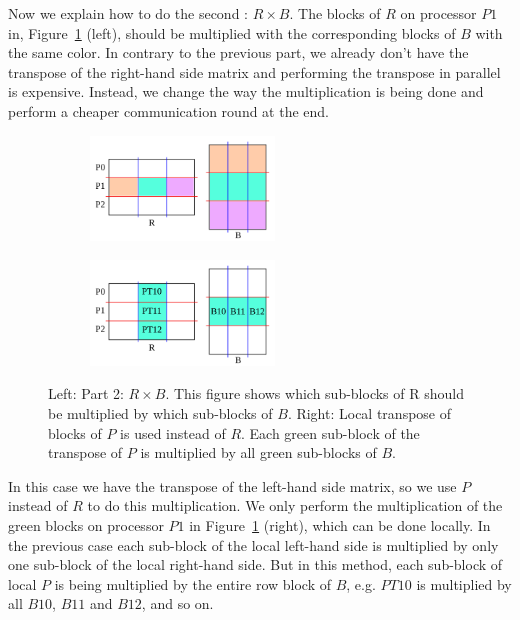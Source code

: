 Now we explain how to do the second \mm: $R \times B$. The blocks of $R$ on processor $P1$ in, Figure~\ref{fig:part2d} (left), should be multiplied with the corresponding blocks of $B$ with the same color. In contrary to the previous part, we already don't have the transpose of the right-hand side matrix and performing the transpose in parallel is expensive. Instead, we change the way the multiplication is being done and perform a cheaper communication round at the end.

\begin{figure}[tbh]
    \centering
    \begin{subfigure}{.45\textwidth}
        \includegraphics[width=5cm,height=2.8cm]{./figures/part2d.pdf}
    \end{subfigure}
    \begin{subfigure}{.45\textwidth}
        \centering
        \includegraphics[width=5cm,height=2.8cm]{./figures/part2e.pdf}
    \end{subfigure}
    \caption{Left: Part 2: $R \times B$. This figure shows which sub-blocks of R should be multiplied by which sub-blocks of $B$. Right: Local transpose of blocks of $P$ is used instead of $R$. Each green sub-block of the transpose of $P$ is multiplied by all green sub-blocks of $B$.}
    \label{fig:part2d}
\end{figure}

In this case we have the transpose of the left-hand side matrix, so we use $P$ instead of $R$ to do this multiplication.
We only perform the multiplication of the green blocks on processor $P1$ in Figure~\ref{fig:part2d} (right), which can be done locally.
%
In the previous case each sub-block of the local left-hand side is multiplied by only one sub-block of the local right-hand side.
But in this method, each sub-block of local $P$ is being multiplied by the entire row block of $B$, e.g. $PT10$ is multiplied by all $B10$, $B11$ and $B12$, and so on.

